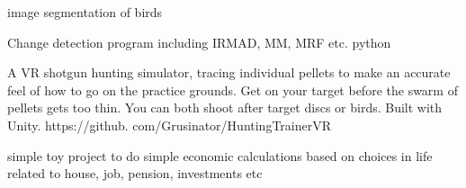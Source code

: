 
\divider

image segmentation of birds
    
\divider

   Change detection program including IRMAD, MM, MRF etc.
python
\divider


\divider

    A VR shotgun hunting simulator, tracing individual pellets to make an accurate feel of how to go on the practice grounds.
 Get on your target before the swarm of pellets gets too thin.
 You can both shoot after target discs or birds.
 Built with Unity.
 https://github.
com/Grusinator/HuntingTrainerVR
      
\divider


   
\divider

simple toy project to do simple economic calculations based on choices in life related to house, job, pension, investments etc
   
